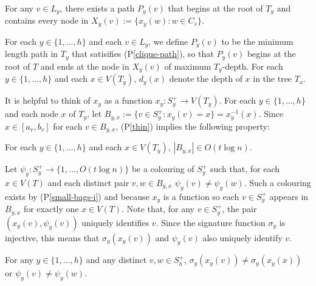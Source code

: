 \documentclass{patmorin}
\newcommand{\pref}[1]{(P\ref{#1})}
\begin{document}
\begin{compactenum}[(P1)]\setcounter{enumi}{1}
    \item For any $v\in L_y$, there exists a path $P_y(v)$ that begins at the root of $T_y$ and contains every node in $X_y(v):=\{x_{y}(w): w\in C_v\}$.\label{clique-path}
\end{compactenum}

For each $y\in\{1,\ldots,h\}$ and each $v\in L_y$, we define $P_y(v)$ to be the minimum length path in $T_y$ that satisifies \pref{clique-path}, so that $P_y(v)$ begins at the root of $T$ and ends at the node in $X_y(v)$ of maximum $T_y$-depth. For each $y\in\{1,\ldots,h\}$ and each $x\in V(T_y)$, $d_y(x)$ denote the depth of $x$ in the tree $T_x$.

It is helpful to think of $x_y$ as a function $x_y:S^+_y\to V(T_y)$.  For each $y\in\{1,\ldots,h\}$ and each node $x$ of $T_y$, let $B_{y,x}:=\{v\in S^+_y: x_y(v)=x\}=x_y^{-1}(x)$.  Since $x\in[a_v,b_v]$ for each $v\in B_{y,x}$, \pref{thin} implies the following property:

\begin{compactenum}[(P1)]\setcounter{enumi}{2}
    \item For each $y\in\{1,\ldots,h\}$ and each $x\in V(T_y)$, $|B_{y,x}|\in O(t\log n)$. \label{small-bags-i}
\end{compactenum}

Let $\psi_y:S^+_y\to\{1,\ldots,O(t\log n)\}$ be a colouring of $S^+_y$ such that, for each $x\in V(T)$ and each distinct pair $v,w\in B_{y,x}$ $\psi_y(v)\neq\psi_y(w)$.  Such a colouring exists by \pref{small-bags-i} and because $x_y$ is a function so each $v\in S^+_y$ appears in $B_{y,x}$ for exactly one $x\in V(T)$.  Note that, for any $v\in S^+_y$, the pair $(x_y(v), \psi_y(v))$ uniquely identifies $v$.  Since the signature function $\sigma_y$ is injective, this means that $\sigma_y(x_y(v))$ and $\psi_y(v)$ also uniquely identify $v$.

\begin{compactenum}[(P1)]\setcounter{enumi}{3}
    \item For any $y\in\{1,\ldots,h\}$ and any distinct $v,w\in S^+_h$, $\sigma_y(x_y(v))\neq \sigma_y(x_y(x)) $ or $\psi_y(v)\neq\psi_y(w)$.\label{unique-match}
\end{compactenum}
\end{document}
